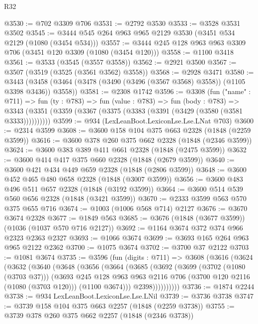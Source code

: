 \begin{lexlean}{R32}
\begin{coremodule}
@3530 := @702 @3309 @706
@3531 := @2792 @3530
@3533 := @3528 @3531 @3502
@3545 := @3444 @545 @264 @963 @965 @2129 @3530 (@3451 @534 @2129 (@1080 (@3454 @534)))
@3557 := @3444 @245 @128 @963 @963 @3309 @706 (@3451 @120 @3309 (@1080 (@3454 @120)))
@3558 := @1100 @3418
@3561 := @3533 (@3545 (@3557 @3558))
@3562 := @2921 @3500
@3567 := @3507 (@3519 (@3525 (@3561 @3562) @3558))
@3568 := @2928 @3471
@3580 := @3443 (@3458 (@3464 (@3478 (@3490 (@3496 (@3567 @3568) @3558)) (@1105 @3398 @3436)) @3558))
@3581 := @2308 @1742
@3596 := @3308
    (fun ("name" : @711) =>
    fun (ty : @783) =>
    fun (value : @783) =>
    fun (body : @783) =>
    @3343 (@3351 (@3359 (@3367 (@3375 (@3383 (@3391 (@3429 (@3580 (@3581 @3333))))))))))
@3599 := @934 (LexLeanBoot.LexiconLse.Lse.LNat @703)
@3600 := @2314 @3599
@3608 := @3600 @158 @104 @375 @663 @2328 (@1848 (@2259 @3599))
@3616 := @3600 @378 @260 @375 @662 @2328 (@1848 (@2346 @3599))
@3624 := @3600 @383 @389 @411 @661 @2328 (@1848 (@2475 @3599))
@3632 := @3600 @414 @417 @375 @660 @2328 (@1848 (@2679 @3599))
@3640 := @3600 @421 @434 @449 @659 @2328 (@1848 (@2806 @3599))
@3648 := @3600 @452 @465 @480 @658 @2328 (@1848 (@3007 @3599))
@3656 := @3600 @483 @496 @511 @657 @2328 (@1848 (@3192 @3599))
@3664 := @3600 @514 @539 @560 @656 @2328 (@1848 (@3421 @3599))
@3670 := @2333 @3599 @563 @570 @375 @655 @716
@3674 := @1003 (@1006 @568 @714) @2127
@3676 := @3670 @3674 @2328
@3677 := @1849 @563
@3685 := @3676 (@1848 (@3677 @3599)) (@1036 (@1037 @570 @716 @2127))
@3692 := @1164 @3674 @372 @374 @966 @2323 @2363 @2327
@3693 := @1066 @3674
@3699 := @3693 @165 @264 @963 @965 @2122 @2362
@3700 := @1075 @3674
@3702 := @3700 @37 @2122
@3703 := @1081 @3674
@3735 := @3596
    (fun (digits : @711) =>
    @3608
      (@3616
        (@3624
          (@3632
            (@3640
              (@3648
                (@3656
                  (@3664
                    (@3685
                      (@3692
                        (@3699
                          (@3702 (@1080 (@3703 @37)))
                          (@3693
                            @245
                            @128
                            @963
                            @963
                            @2116
                            @706
                            (@3700 @120 @2116 (@1080 (@3703 @120)))
                            (@1100 @3674)))
                        @2398))))))))))
@3736 := @1874 @2244
@3738 := @934 LexLeanBoot.LexiconLse.Lse.LNil
@3739 := @3736 @3738
@3747 := @3739 @158 @104 @375 @663 @2257 (@1848 (@2259 @3738))
@3755 := @3739 @378 @260 @375 @662 @2257 (@1848 (@2346 @3738))

\end{coremodule}
\end{lexlean}
